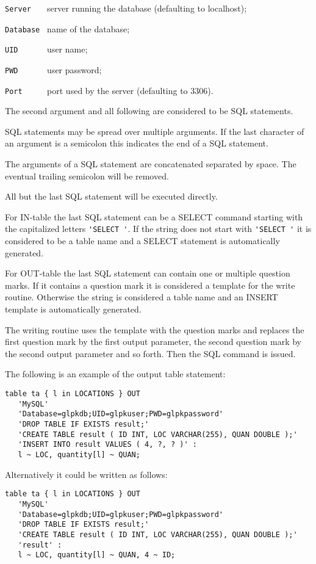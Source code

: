 \documentclass[11pt]{report}
\begin{document}
\newpage

\verb|Server   | server running the database (defaulting to localhost);

\verb|Database | name of the database;

\verb|UID      | user name;

\verb|PWD      | user password;

\verb|Port     | port used by the server (defaulting to 3306).

The second argument and all following are considered to be SQL
statements.

SQL statements may be spread over multiple arguments.  If the last
character of an argument is a semicolon this indicates the end of
a SQL statement.

The arguments of a SQL statement are concatenated separated by space.
The eventual trailing semicolon will be removed.

All but the last SQL statement will be executed directly.

For IN-table the last SQL statement can be a SELECT command starting
with the capitalized letters \verb|'SELECT '|. If the string does not
start with \verb|'SELECT '| it is considered to be a table name and a
SELECT statement is automatically generated.

For OUT-table the last SQL statement can contain one or multiple
question marks. If it contains a question mark it is considered a
template for the write routine. Otherwise the string is considered a
table name and an INSERT template is automatically generated.

The writing routine uses the template with the question marks and
replaces the first question mark by the first output parameter, the
second question mark by the second output parameter and so forth. Then
the SQL command is issued.

The following is an example of the output table statement:

\begin{verbatim}
table ta { l in LOCATIONS } OUT
   'MySQL'
   'Database=glpkdb;UID=glpkuser;PWD=glpkpassword'
   'DROP TABLE IF EXISTS result;'
   'CREATE TABLE result ( ID INT, LOC VARCHAR(255), QUAN DOUBLE );'
   'INSERT INTO result VALUES ( 4, ?, ? )' :
   l ~ LOC, quantity[l] ~ QUAN;
\end{verbatim}

\noindent
Alternatively it could be written as follows:

\begin{verbatim}
table ta { l in LOCATIONS } OUT
   'MySQL'
   'Database=glpkdb;UID=glpkuser;PWD=glpkpassword'
   'DROP TABLE IF EXISTS result;'
   'CREATE TABLE result ( ID INT, LOC VARCHAR(255), QUAN DOUBLE );'
   'result' :
   l ~ LOC, quantity[l] ~ QUAN, 4 ~ ID;
\end{verbatim}
\end{document}
